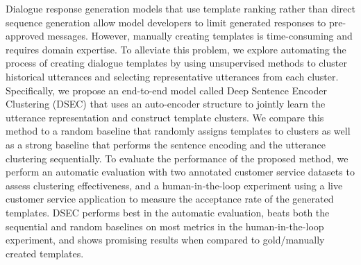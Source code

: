 Dialogue response generation models that use template ranking rather than direct sequence generation allow model developers to limit generated responses to pre-approved messages. However, manually creating templates is time-consuming and requires domain expertise. To alleviate this problem, we explore automating the process of creating dialogue templates by using unsupervised methods to cluster historical utterances and selecting representative utterances from each cluster. Specifically, we propose an end-to-end model called Deep Sentence Encoder Clustering (DSEC) that uses an auto-encoder structure to jointly learn the utterance representation and construct template clusters. We compare this method to a random baseline that randomly assigns templates to clusters as well as a strong baseline that performs the sentence encoding and the utterance clustering sequentially. To evaluate the performance of the proposed method, we perform an automatic evaluation with two annotated customer service datasets to assess clustering effectiveness, and a human-in-the-loop experiment using a live customer service application to measure the acceptance rate of the generated templates.  DSEC performs best in the automatic evaluation, beats both the sequential and random baselines on most metrics in the human-in-the-loop experiment, and shows promising results when compared to gold/manually created templates.
